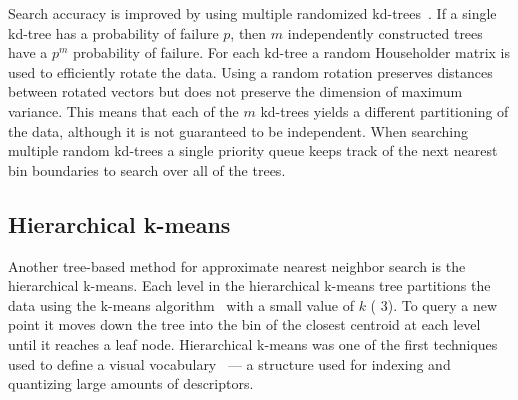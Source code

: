             Search accuracy is improved by using multiple randomized
              kd-trees~\cite{silpaanan_optimised_2008}.
            If a single kd-tree has a probability of failure $p$, then
              $m$ independently constructed trees have a $p^m$
              probability of failure.
            For each kd-tree a random Householder matrix is used to
              efficiently rotate the data.
            Using a random rotation preserves distances between rotated
              vectors but does not preserve the dimension of maximum
              variance.
            This means that each of the $m$ kd-trees yields a different
              partitioning of the data, although it is not guaranteed to
              be independent.
            When searching multiple random kd-trees a single priority
              queue keeps track of the next nearest bin boundaries to
              search over all of the trees.


        \subsection{Hierarchical k-means}
            Another tree-based method for approximate nearest neighbor
              search is the hierarchical k-means.
            Each level in the hierarchical k-means tree partitions the
              data using the k-means algorithm~\cite{lloyd_least_1982}
              with a small value of $k$ (\eg{} 3).
            To query a new point it moves down the tree into the bin of
              the closest centroid at each level until it reaches a leaf
              node.
            Hierarchical k-means was one of the first techniques used
              to define a visual vocabulary~\cite{nister_scalable_2006}
              --- a structure used for indexing and quantizing large
              amounts of descriptors.
        
